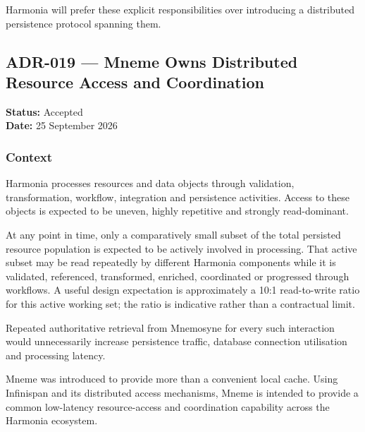 Harmonia will prefer these explicit responsibilities over introducing a distributed persistence protocol spanning them.


\subsection{ADR-019 --- Mneme Owns Distributed Resource Access and Coordination}
\label{adr:019-mneme-distributed-resource-access-coordination}

\textbf{Status:} Accepted\\
\textbf{Date:} 25 September 2026

\subsubsection{Context}

Harmonia processes resources and data objects through validation, transformation, workflow, integration and persistence activities. Access to these objects is expected to be uneven, highly repetitive and strongly read-dominant.

At any point in time, only a comparatively small subset of the total persisted resource population is expected to be actively involved in processing. That active subset may be read repeatedly by different Harmonia components while it is validated, referenced, transformed, enriched, coordinated or progressed through workflows. A useful design expectation is approximately a 10:1 read-to-write ratio for this active working set; the ratio is indicative rather than a contractual limit.

Repeated authoritative retrieval from Mnemosyne for every such interaction would unnecessarily increase persistence traffic, database connection utilisation and processing latency.

Mneme was introduced to provide more than a convenient local cache. Using Infinispan and its distributed access mechanisms, Mneme is intended to provide a common low-latency resource-access and coordination capability across the Harmonia ecosystem.

